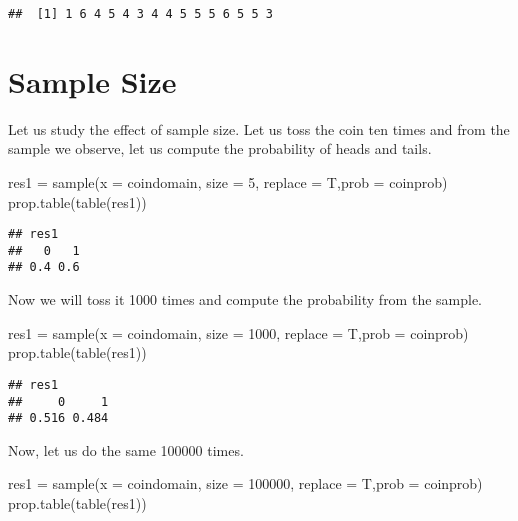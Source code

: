 \documentclass[
]{article}
\newenvironment{Shaded}{\begin{snugshade}}{\end{snugshade}}
\newcommand{\AttributeTok}[1]{\textcolor[rgb]{0.77,0.63,0.00}{#1}}
\newcommand{\DecValTok}[1]{\textcolor[rgb]{0.00,0.00,0.81}{#1}}
\newcommand{\FunctionTok}[1]{\textcolor[rgb]{0.00,0.00,0.00}{#1}}
\newcommand{\NormalTok}[1]{#1}
\newcommand{\OtherTok}[1]{\textcolor[rgb]{0.56,0.35,0.01}{#1}}
\begin{document}
\begin{verbatim}
##  [1] 1 6 4 5 4 3 4 4 5 5 5 6 5 5 3
\end{verbatim}

\hypertarget{sample-size}{%
\section{Sample Size}\label{sample-size}}

Let us study the effect of sample size. Let us toss the coin ten times
and from the sample we observe, let us compute the probability of heads
and tails.

\begin{Shaded}
\begin{Highlighting}[]
\NormalTok{res1 }\OtherTok{=} \FunctionTok{sample}\NormalTok{(}\AttributeTok{x =}\NormalTok{ coindomain, }\AttributeTok{size =} \DecValTok{5}\NormalTok{, }\AttributeTok{replace =}\NormalTok{ T,}\AttributeTok{prob =}\NormalTok{ coinprob)}
\FunctionTok{prop.table}\NormalTok{(}\FunctionTok{table}\NormalTok{(res1))}
\end{Highlighting}
\end{Shaded}

\begin{verbatim}
## res1
##   0   1 
## 0.4 0.6
\end{verbatim}

Now we will toss it 1000 times and compute the probability from the
sample.

\begin{Shaded}
\begin{Highlighting}[]
\NormalTok{res1 }\OtherTok{=} \FunctionTok{sample}\NormalTok{(}\AttributeTok{x =}\NormalTok{ coindomain, }\AttributeTok{size =} \DecValTok{1000}\NormalTok{, }\AttributeTok{replace =}\NormalTok{ T,}\AttributeTok{prob =}\NormalTok{ coinprob)}
\FunctionTok{prop.table}\NormalTok{(}\FunctionTok{table}\NormalTok{(res1))}
\end{Highlighting}
\end{Shaded}

\begin{verbatim}
## res1
##     0     1 
## 0.516 0.484
\end{verbatim}

Now, let us do the same 100000 times.

\begin{Shaded}
\begin{Highlighting}[]
\NormalTok{res1 }\OtherTok{=} \FunctionTok{sample}\NormalTok{(}\AttributeTok{x =}\NormalTok{ coindomain, }\AttributeTok{size =} \DecValTok{100000}\NormalTok{, }\AttributeTok{replace =}\NormalTok{ T,}\AttributeTok{prob =}\NormalTok{ coinprob)}
\FunctionTok{prop.table}\NormalTok{(}\FunctionTok{table}\NormalTok{(res1))}
\end{Highlighting}
\end{Shaded}
\end{document}
